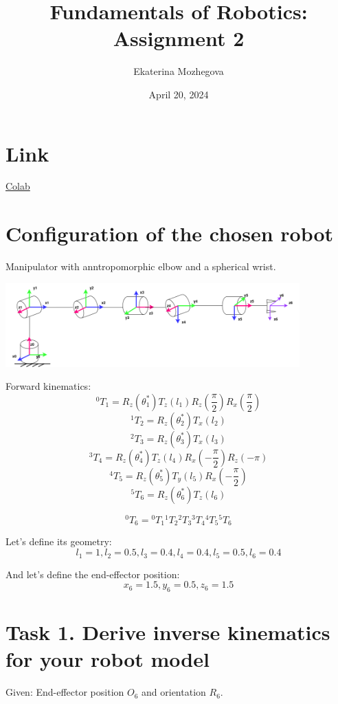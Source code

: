 \documentclass{article}
\title{Fundamentals of Robotics: Assignment 2}
\author{Ekaterina Mozhegova}
\date{April 20, 2024}
\begin{document}
\maketitle

\section{Link}

\href{https://colab.research.google.com/drive/1hU13PXIqbAtPv2cby5qNB10PobzW39JC?usp=sharing}{Colab}

\section{Configuration of the chosen robot}

Manipulator with anntropomorphic elbow and a spherical wrist. 

\begin{center}
    \includegraphics*[width=0.85\textwidth]{images/new_manipulator.png}
\end{center}

Forward kinematics:
\[{}^0T_1 = R_z(\theta_1^*) T_z(l_1) R_z(\frac{\pi}{2}) R_x(\frac{\pi}{2})\]
\[{}^1T_2 = R_z(\theta_2^*) T_x(l_2) \]
\[{}^2T_3 = R_z(\theta_3^*) T_x(l_3) \]
\[{}^3T_4 = R_z(\theta_4^*) T_z(l_4) R_x(-\dfrac{\pi}{2}) R_z(-\pi)\]
\[{}^4T_5 = R_z(\theta_5^*) T_y(l_5) R_x(-\dfrac{\pi}{2})\]
\[{}^5T_6 = R_z(\theta_6^*) T_z(l_6) \]

\[{}^0T_6 = {}^0T_1 {}^1T_2 {}^2T_3 {}^3T_4 {}^4T_5 {}^5T_6 \]

Let's define its geometry:
\[l_1 = 1, l_2 = 0.5, l_3 = 0.4, l_4 =0.4, l_5=0.5, l_6 = 0.4\]

And let's define the end-effector position:
\[x_6=1.5, y_6=0.5, z_6 = 1.5\]


\section{Task 1. Derive inverse kinematics for your robot model}


Given:
End-effector position $O_6$ and orientation $R_6$.
\end{document}
